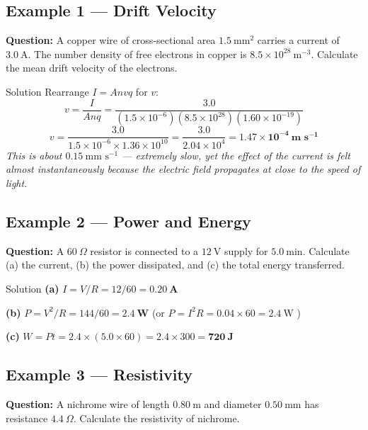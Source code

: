 \subsection*{Example 1 — Drift Velocity}

\textbf{Question:} A copper wire of cross-sectional area $1.5\ \text{mm}^2$ carries a current of $3.0\ \text{A}$. The number density of free electrons in copper is $8.5\times10^{28}\ \text{m}^{-3}$. Calculate the mean drift velocity of the electrons.

\begin{examplebox}{Solution}
Rearrange $I = Anvq$ for $v$:
$$v = \frac{I}{Anq} = \frac{3.0}{(1.5\times10^{-6})(8.5\times10^{28})(1.60\times10^{-19})}$$
$$v = \frac{3.0}{1.5\times10^{-6} \times 1.36\times10^{10}} = \frac{3.0}{2.04\times10^{4}} = \mathbf{1.47\times10^{-4}\ \text{m s}^{-1}}$$
\textit{This is about $0.15\ \text{mm s}^{-1}$ — extremely slow, yet the effect of the current is felt almost instantaneously because the electric field propagates at close to the speed of light.}
\end{examplebox}

\subsection*{Example 2 — Power and Energy}

\textbf{Question:} A $60\ \Omega$ resistor is connected to a $12\ \text{V}$ supply for $5.0\ \text{min}$. Calculate (a) the current, (b) the power dissipated, and (c) the total energy transferred.

\begin{examplebox}{Solution}
\textbf{(a)} \quad $I = V/R = 12/60 = \mathbf{0.20\ \text{A}}$

\vspace{0.3em}
\textbf{(b)} \quad $P = V^2/R = 144/60 = \mathbf{2.4\ \text{W}}$ \quad (or $P = I^2R = 0.04\times60 = 2.4\ \text{W}$  \checkmark)

\vspace{0.3em}
\textbf{(c)} \quad $W = Pt = 2.4 \times (5.0\times60) = 2.4\times300 = \mathbf{720\ \text{J}}$
\end{examplebox}

\subsection*{Example 3 — Resistivity}

\textbf{Question:} A nichrome wire of length $0.80\ \text{m}$ and diameter $0.50\ \text{mm}$ has resistance $4.4\ \Omega$. Calculate the resistivity of nichrome.

